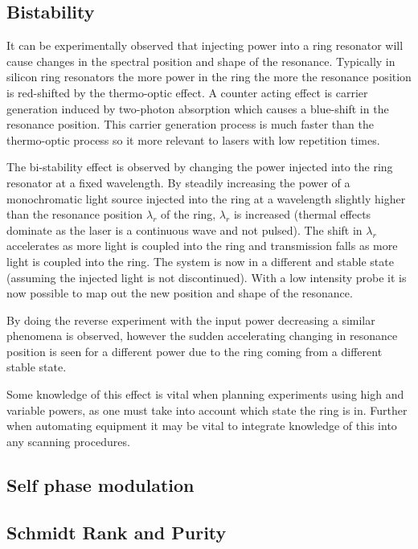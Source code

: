 \subsection{Bistability}
It can be experimentally observed that injecting power into a ring resonator will cause changes in the spectral position and shape of the resonance. Typically in silicon ring resonators the more power in the ring the more the resonance position is red-shifted by the thermo-optic effect\cite{almeida_optical_2004-1}. A counter acting effect is carrier generation induced by two-photon absorption \cite{xu_carrier-induced_2006} which causes a blue-shift in the resonance position. This carrier generation process is much faster than the thermo-optic process so it more relevant to lasers with low repetition times. 

The bi-stability effect is observed by changing the power injected into the ring resonator at a fixed wavelength. By steadily increasing the power of a monochromatic light source injected into the ring at a wavelength slightly higher than the resonance position $\lambda_{r}$ of the ring, $\lambda_{r}$ is increased (thermal effects dominate as the laser is a continuous wave and not pulsed). The shift in $\lambda_{r}$ accelerates as more light is coupled into the ring and transmission falls as more light is coupled into the ring. The system is now in a different and stable state (assuming the injected light is not discontinued). With a low intensity probe it is now possible to map out the new position and shape of the resonance.

By doing the reverse experiment with the input power decreasing a similar phenomena is observed, however the sudden accelerating changing in resonance position is seen for a different power due to the ring coming from a different stable state. 

Some knowledge of this effect is vital when planning experiments using high and variable powers, as one must take into account which state the ring is in. Further when automating equipment it may be vital to integrate knowledge of this into any scanning procedures. 


\subsection{Self phase modulation}
\subsection{Schmidt Rank and Purity}
